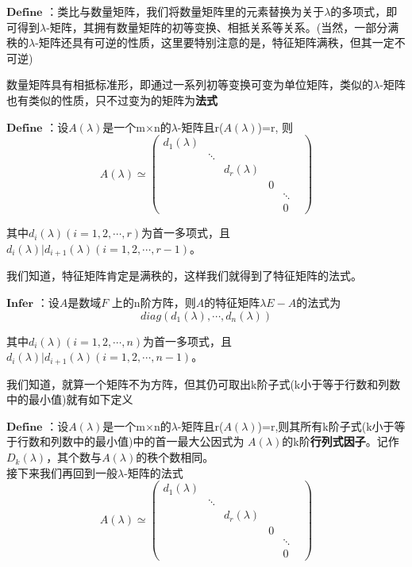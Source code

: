 \documentclass[lang=cn,10pt]{elegantbook}
\begin{document}
$\mathbf{Define}$ ：类比与数量矩阵，我们将数量矩阵里的元素替换为关于$\lambda$的多项式，即可得到$\lambda$-矩阵，其拥有数量矩阵的初等变换、相抵关系等关系。(当然，一部分满秩的$\lambda$-矩阵还具有可逆的性质，这里要特别注意的是，特征矩阵满秩，但其一定不可逆)

数量矩阵具有相抵标准形，即通过一系列初等变换可变为单位矩阵，类似的$\lambda$-矩阵也有类似的性质，只不过变为的矩阵为\textbf{法式}

$\mathbf{Define}$ ：设$\mathit{A}(\lambda)$是一个m$\times$n的$\lambda$-矩阵且r($\mathit{A}(\lambda)$)=r,
则
\begin{equation*}
\mathit{A}(\lambda)\simeq 
\begin{pmatrix}
	d_{1}(\lambda ) &  &  &  &  & \\
	&  \ddots &  &  &  & \\
	&  &  d_{r}(\lambda )&  &  & \\
	&  &  &  0&  & \\
	&  &  &  &  \ddots & \\
	&  &  &  &  0&
\end{pmatrix}
\end{equation*}


其中$d_{i}(\lambda )(i=1,2,\cdots,r)$为首一多项式，且$d_{i}(\lambda )|d_{i+1}(\lambda )(i=1,2,\cdots,r-1)$。

我们知道，特征矩阵肯定是满秩的，这样我们就得到了特征矩阵的法式。

$\mathbf{Infer}$ ：设$\mathit{A}$是数域$\mathit{F}$
上的n阶方阵，则$\mathit{A}$的特征矩阵$\lambda\mathit{E-A}$的法式为
\begin{equation*}
	diag(d_{1}(\lambda ),\cdots,d_{n}(\lambda ))
\end{equation*}

其中$d_{i}(\lambda )(i=1,2,\cdots,n)$为首一多项式，且$d_{i}(\lambda )|d_{i+1}(\lambda )(i=1,2,\cdots,n-1)$。

我们知道，就算一个矩阵不为方阵，但其仍可取出k阶子式(k小于等于行数和列数中的最小值)就有如下定义

$\mathbf{Define}$ ：设$\mathit{A}(\lambda)$是一个m$\times$n的$\lambda$-矩阵且r($\mathit{A}(\lambda)$)=r,则其所有k阶子式(k小于等于行数和列数中的最小值)中的首一最大公因式为
$\mathit{A}(\lambda)$的k阶\textbf{行列式因子}。记作$\mathit{D_{k}}(\lambda)$，其个数与$\mathit{A}(\lambda)$的秩个数相同。~\\

接下来我们再回到一般$\lambda$-矩阵的法式
\begin{equation*}
	\mathit{A}(\lambda)\simeq 
	\begin{pmatrix}
		d_{1}(\lambda ) &  &  &  &  & \\
		&  \ddots &  &  &  & \\
		&  &  d_{r}(\lambda )&  &  & \\
		&  &  &  0&  & \\
		&  &  &  &  \ddots & \\
		&  &  &  &  0&
	\end{pmatrix}
\end{equation*}
\end{document}
